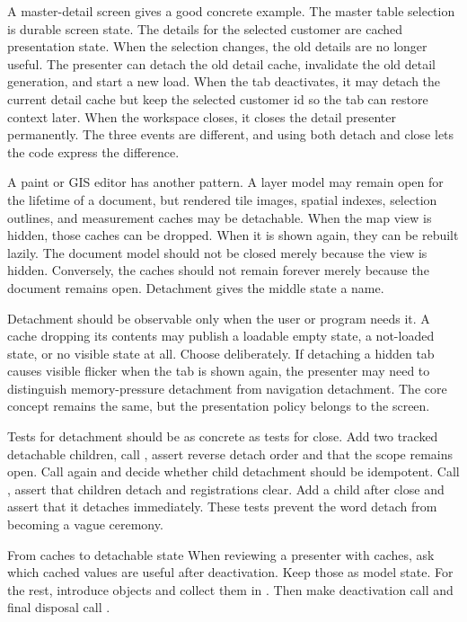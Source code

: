 A master-detail screen gives a good concrete example. The master table
selection is durable screen state. The details for the selected customer are
cached presentation state. When the selection changes, the old details are no
longer useful. The presenter can detach the old detail cache, invalidate the
old detail generation, and start a new load. When the tab deactivates, it may
detach the current detail cache but keep the selected customer id so the tab
can restore context later. When the workspace closes, it closes the detail
presenter permanently. The three events are different, and using both detach
and close lets the code express the difference.

A paint or GIS editor has another pattern. A layer model may remain open for
the lifetime of a document, but rendered tile images, spatial indexes,
selection outlines, and measurement caches may be detachable. When the map
view is hidden, those caches can be dropped. When it is shown again, they can
be rebuilt lazily. The document model should not be closed merely because the
view is hidden. Conversely, the caches should not remain forever merely because
the document remains open. Detachment gives the middle state a name.

Detachment should be observable only when the user or program needs it. A cache
dropping its contents may publish a loadable empty state, a not-loaded state,
or no visible state at all. Choose deliberately. If detaching a hidden tab
causes visible flicker when the tab is shown again, the presenter may need to
distinguish memory-pressure detachment from navigation detachment. The core
concept remains the same, but the presentation policy belongs to the screen.

Tests for detachment should be as concrete as tests for close. Add two tracked
detachable children, call , assert reverse detach order and that
the scope remains open. Call  again and decide whether child
detachment should be idempotent. Call , assert that children detach
and registrations clear. Add a child after close and assert that it detaches
immediately. These tests prevent the word detach from becoming a vague
ceremony.

\begin{migrationbox}{From caches to detachable state}
When reviewing a presenter with caches, ask which cached values are useful
after deactivation. Keep those as model state. For the rest, introduce
 objects and collect them in . Then make
deactivation call  and final disposal call .
\end{migrationbox}

